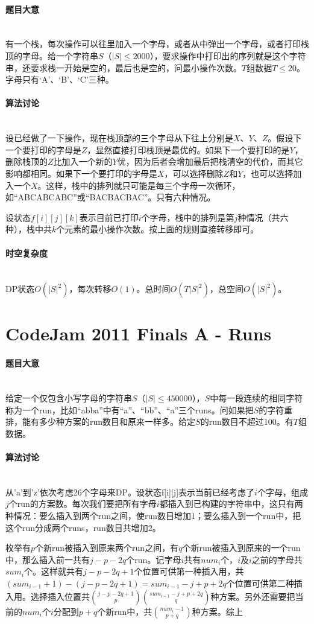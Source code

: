 \documentclass[UTF8]{ctexart}
\newcommand{\myparagraph}[1]{\paragraph{#1}\mbox{}\\}
\theoremstyle{nonumberplain}
\begin{document}
		\myparagraph{题目大意}
		
			有一个栈，每次操作可以往里加入一个字母，或者从中弹出一个字母，或者打印栈顶的字母。给一个字符串$S$（$|S| \leq 2000$），要求操作中打印出的序列就是这个字符串，还要求栈一开始是空的，最后也是空的，问最小操作次数。$T$组数据$T \leq 20$。字母只有‘A’、‘B’、‘C’三种。
		
		\myparagraph{算法讨论}
		
			设已经做了一下操作，现在栈顶部的三个字母从下往上分别是$X$、$Y$、$Z$。假设下一个要打印的字母是$Z$，显然直接打印栈顶是最优的。如果下一个要打印的是$Y$，删除栈顶的$Z$比加入一个新的$Y$优，因为后者会增加最后把栈清空的代价，而其它影响都相同。如果下一个要打印的字母是$X$，可以选择删除$Z$和$Y$，也可以选择加入一个$X$。这样，栈中的排列就只可能是每三个字母一次循环，如“ABCABCABC”或“BACBACBAC”。只有六种情况。
			
			设状态$f[i][j][k]$表示目前已打印$i$个字母，栈中的排列是第$j$种情况（共六种），栈中共$k$个元素的最小操作次数。按上面的规则直接转移即可。
		
		\myparagraph{时空复杂度}
		
			DP状态$O(|S|^2)$，每次转移$O(1)$。总时间$O(T|S|^2)$，总空间$O(|S|^2)$。
	
	\section{CodeJam 2011 Finals A - Runs}
	
		\myparagraph{题目大意}
		
			给定一个仅包含小写字母的字符串$S$（$|S| \leq 450000$），$S$中每一段连续的相同字符称为一个run，比如“abba”中有“a”、“bb”、“a”三个runs。问如果把$S$的字符重排，能有多少种方案的run数目和原来一样多。给定$S$的run数目不超过100。有$T$组数据。
		
		\myparagraph{算法讨论}
		
			从'a'到'z'依次考虑26个字母来DP。设状态f[i][j]表示当前已经考虑了$i$个字母，组成$j$个run的方案数。每次我们要把所有字母$i$都插入到已构建的字符串中，这只有两种情况：要么插入到两个run之间，使run数目增加1；要么插入到一个run中，把这个run分成两个runs，run数目共增加2。
			
			枚举有$p$个新run被插入到原来两个run之间，有$q$个新run被插入到原来的一个run中，那么插入前一共有$j-p-2q$个run。记字母$i$共有$num_i$个，$i$及$i$之前的字母共$sum_i$个。这样就共有$j-p-2q+1$个位置可供第一种插入用，共$(sum_{i-1}+1)-(j-p-2q+1)=sum_{i-1}-j+p+2q$个位置可供第二种插入用。选择插入位置共$\binom{j-p-2q+1}{p}\binom{sum_{i-1}-j+p+2q}{q}$种方案。另外还需要把当前的$num_i$个$i$分配到$p+q$个新run中，共$\binom{num_i-1}{p+q}$种方案。综上
			
\end{document}
